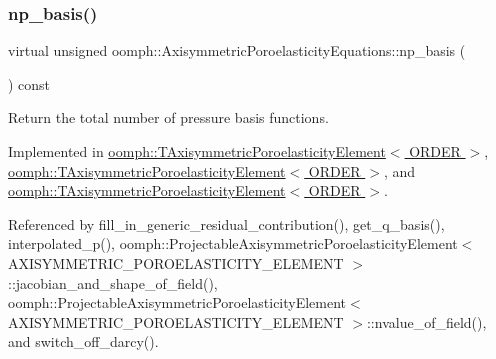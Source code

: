 \mbox{\label{classoomph_1_1AxisymmetricPoroelasticityEquations_a8a17486deaa1115a98608e76344aa67c}} 
\subsubsection{\texorpdfstring{np\+\_\+basis()}{np\_basis()}}
{\footnotesize\ttfamily virtual unsigned oomph\+::\+Axisymmetric\+Poroelasticity\+Equations\+::np\+\_\+basis (\begin{DoxyParamCaption}{ }\end{DoxyParamCaption}) const\hspace{0.3cm}{\ttfamily [pure virtual]}}



Return the total number of pressure basis functions. 



Implemented in \hyperlink{classoomph_1_1TAxisymmetricPoroelasticityElement_ae1fdf6e051bbc93b8c485f1d3f9fb9c6}{oomph\+::\+T\+Axisymmetric\+Poroelasticity\+Element$<$ O\+R\+D\+E\+R $>$}, \hyperlink{classoomph_1_1TAxisymmetricPoroelasticityElement_a27b709b447e969125867e32c4fb5e10e}{oomph\+::\+T\+Axisymmetric\+Poroelasticity\+Element$<$ O\+R\+D\+E\+R $>$}, and \hyperlink{classoomph_1_1TAxisymmetricPoroelasticityElement_ab0ba7323f782f19c961bb5ccec22aea3}{oomph\+::\+T\+Axisymmetric\+Poroelasticity\+Element$<$ O\+R\+D\+E\+R $>$}.



Referenced by fill\+\_\+in\+\_\+generic\+\_\+residual\+\_\+contribution(), get\+\_\+q\+\_\+basis(), interpolated\+\_\+p(), oomph\+::\+Projectable\+Axisymmetric\+Poroelasticity\+Element$<$ A\+X\+I\+S\+Y\+M\+M\+E\+T\+R\+I\+C\+\_\+\+P\+O\+R\+O\+E\+L\+A\+S\+T\+I\+C\+I\+T\+Y\+\_\+\+E\+L\+E\+M\+E\+N\+T $>$\+::jacobian\+\_\+and\+\_\+shape\+\_\+of\+\_\+field(), oomph\+::\+Projectable\+Axisymmetric\+Poroelasticity\+Element$<$ A\+X\+I\+S\+Y\+M\+M\+E\+T\+R\+I\+C\+\_\+\+P\+O\+R\+O\+E\+L\+A\+S\+T\+I\+C\+I\+T\+Y\+\_\+\+E\+L\+E\+M\+E\+N\+T $>$\+::nvalue\+\_\+of\+\_\+field(), and switch\+\_\+off\+\_\+darcy().

\mbox{\label{classoomph_1_1AxisymmetricPoroelasticityEquations_a8d51be2febf03886ff0b2217ae895b67}} 
